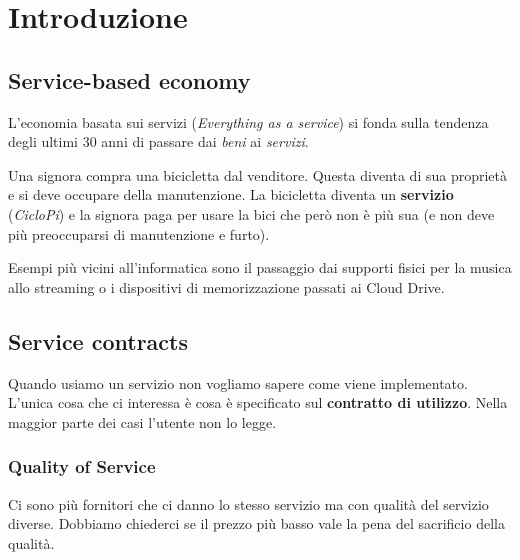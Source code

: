 \newpage
\section{Introduzione}

\subsection{Service-based economy}
L'economia basata sui servizi (\textit{Everything as a service}) si fonda sulla tendenza degli ultimi 30 anni di passare dai \textit{beni} ai \textit{servizi}.
\begin{example}[Bicicletta]
	Una signora compra una bicicletta dal venditore. Questa diventa di sua proprietà e si deve occupare della manutenzione. La bicicletta diventa un \textbf{servizio} (\textit{CicloPi}) e la signora paga per usare la bici che però non è più sua (e non deve più preoccuparsi di manutenzione e furto).
\end{example}
\noindent Esempi più vicini all'informatica sono il passaggio dai supporti fisici per la musica allo streaming o i dispositivi di memorizzazione passati ai Cloud Drive.
\subsection{Service contracts}
Quando usiamo un servizio non vogliamo sapere come viene implementato. L'unica cosa che ci interessa è cosa è specificato sul \textbf{contratto di utilizzo}. Nella maggior parte dei casi l'utente non lo legge.
\subsubsection{Quality of Service}
Ci sono più fornitori che ci danno lo stesso servizio ma con qualità del servizio diverse. Dobbiamo chiederci se il prezzo più basso vale la pena del sacrificio della qualità.

